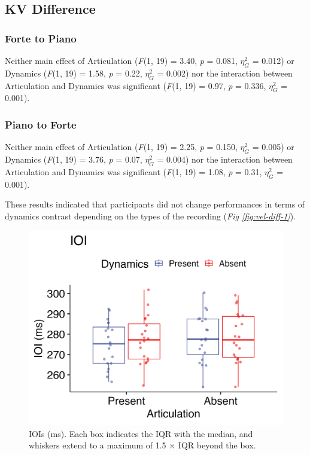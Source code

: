 \documentclass[
  man]{apa6}
\begin{document}
\hypertarget{kv-difference}{%
\subsection{KV Difference}\label{kv-difference}}

\hypertarget{forte-to-piano}{%
\subsubsection{Forte to Piano}\label{forte-to-piano}}

Neither main effect of Articulation (\emph{F}(1, 19) = 3.40, \emph{p} = 0.081, \(\eta_G^2\) = 0.012) or Dynamics (\emph{F}(1, 19) = 1.58, \emph{p} = 0.22, \(\eta_G^2\) = 0.002) nor the interaction between Articulation and Dynamics was significant (\emph{F}(1, 19) = 0.97, \emph{p} = 0.336, \(\eta_G^2\) = 0.001).

\hypertarget{piano-to-forte}{%
\subsubsection{Piano to Forte}\label{piano-to-forte}}

Neither main effect of Articulation (\emph{F}(1, 19) = 2.25, \emph{p} = 0.150, \(\eta_G^2\) = 0.005) or Dynamics (\emph{F}(1, 19) = 3.76, \emph{p} = 0.07, \(\eta_G^2\) = 0.004) nor the interaction between Articulation and Dynamics was significant (\emph{F}(1, 19) = 1.08, \emph{p} = 0.31, \(\eta_G^2\) = 0.001).

These results indicated that participants did not change performances in terms of dynamics contrast depending on the types of the recording (\emph{Fig \ref{fig:vel-diff-1}}).

\begin{figure}
\includegraphics[width=1\linewidth]{manuscript_files/figure-latex/plot-ioi-1-1} \caption{\label{fig:ioi-1}IOIs (ms). Each box indicates the IQR with the median, and whiskers extend to a maximum of 1.5 × IQR beyond the box.}\label{fig:plot-ioi-1}
\end{figure}
\end{document}
